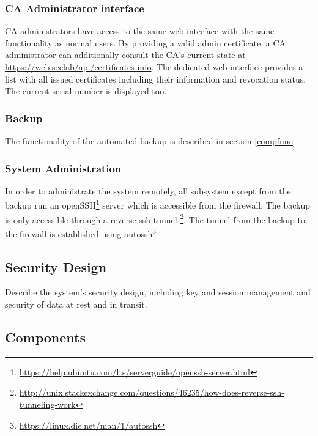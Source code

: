 \documentclass[english]{article}
\begin{document}
 \subsubsection{CA Administrator interface}
 CA administrators have access to the same web interface with the same functionality as normal users.
 By providing a valid admin certificate, a CA administrator can additionally consult the CA's current state at \url{https://web.seclab/api/certificates-info}. The dedicated web interface provides a list with all issued certificates including their information and revocation status. The current serial number is displayed too.
 
\subsubsection{Backup} 
 The functionality of the automated backup is described in section \ref{compfunc}
 \subsubsection{System Administration}
 In order to administrate the system remotely, all subsystem except from the backup run an openSSH\footnote{\url{https://help.ubuntu.com/lts/serverguide/openssh-server.html}} server which is accessible from the firewall. The backup is only accessible through a reverse ssh tunnel \footnote{\url{http://unix.stackexchange.com/questions/46235/how-does-reverse-ssh-tunneling-work}}. The tunnel from the backup to the firewall is established using autossh\footnote{\url{https://linux.die.net/man/1/autossh}}
 
 

\subsection{Security Design}

Describe the system's security design, including key and session management and 
security of data at rest and in transit.


\subsection{Components} \label{components}

  
\end{document}
